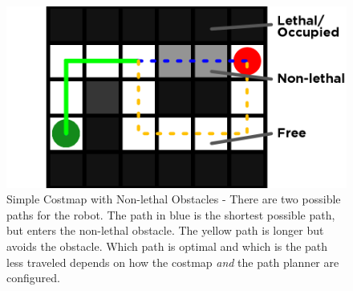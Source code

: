 \begin{figure}
\includegraphics[width=\columnwidth]{graphix/Intro.png}
\caption{Simple Costmap with Non-lethal Obstacles - There are two possible paths for the robot. The path in blue is the shortest possible path, but enters the non-lethal obstacle. The yellow path is longer but avoids the obstacle. Which path is optimal and which is the path less traveled depends on how the costmap \emph{and} the path planner are configured. }
\label{fig:intro}
\end{figure}



